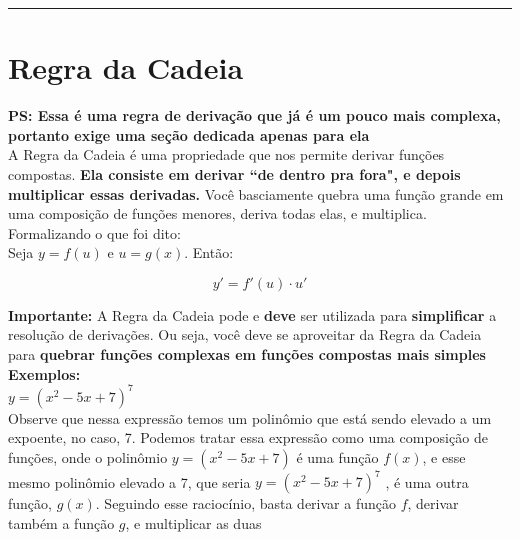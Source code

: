 \documentclass{article}
\begin{document}
\vspace{15pt}
\hrule
\section{Regra da Cadeia}
\textbf{PS: Essa é uma regra de derivação que já é um pouco mais complexa, portanto exige uma seção dedicada apenas para ela}\\[10pt]
A Regra da Cadeia é uma propriedade que nos permite derivar funções compostas. \textbf{Ela consiste em derivar ``de dentro pra fora", e depois multiplicar essas derivadas.} Você basciamente quebra uma função grande em uma composição de funções menores, deriva todas elas, e multiplica. Formalizando o que foi dito:\\[10pt]
Seja \( y = f(u) \) e \( u = g(x) \). Então:

\[
y' = f'(u) \cdot u'
\]

\noindent \textbf{Importante:} A Regra da Cadeia pode e \textbf{deve} ser utilizada para \textbf{simplificar} a resolução de derivações. Ou seja, você deve se aproveitar da Regra da Cadeia para \textbf{quebrar funções complexas em funções compostas mais simples}\\[10pt]
\textbf{Exemplos:}\\[10pt]
\quad \( y = (x^2 - 5x + 7)^7 \)\\[10pt]
Observe que nessa expressão temos um polinômio que está sendo elevado a um expoente, no caso, 7. Podemos tratar essa expressão como uma composição de funções, onde o polinômio \( y = (x^2 - 5x + 7)\) é uma função $f(x)$, e esse mesmo polinômio elevado a 7, que seria \( y = (x^2 - 5x + 7)^7 \) , é uma outra função, $g(x)$. Seguindo esse raciocínio, basta derivar a função $f$, derivar também a função $g$, e multiplicar as duas
\end{document}

